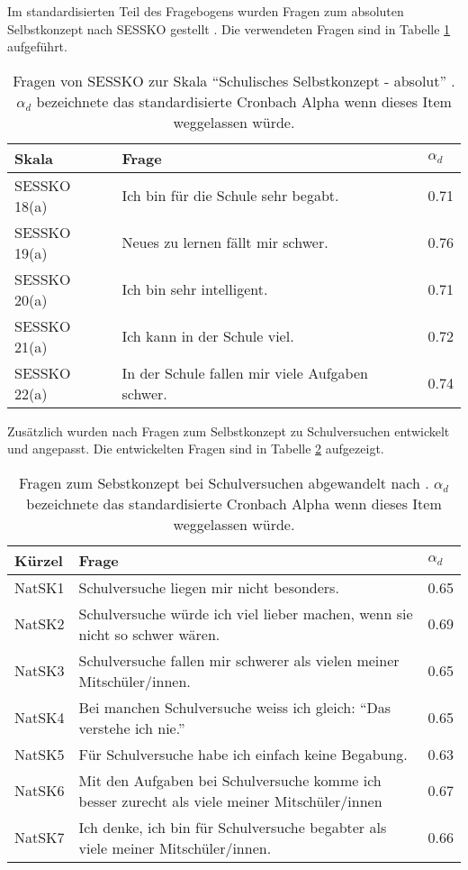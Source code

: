 Im standardisierten Teil des Fragebogens wurden Fragen zum absoluten Selbstkonzept nach SESSKO gestellt \citep{Schone2002}. Die verwendeten Fragen sind in Tabelle \ref{tab:SESSKO} aufgeführt. 



\begin{table}[htbp]
  \centering
\begin{tabular}{|p{3cm}|p{9cm}|p{1cm}|}
\hline Skala & Frage & $\alpha_d$  \\ 
\hline SESSKO 18(a) & Ich bin für die Schule sehr begabt. &  0.71  \\ 
\hline SESSKO 19(a) & Neues zu lernen fällt mir schwer.  &  0.76 \\ 
\hline SESSKO 20(a) & Ich bin sehr intelligent. &  0.71  \\ 
\hline SESSKO 21(a) & Ich kann in der Schule viel. &  0.72   \\ 
\hline SESSKO 22(a) & In der Schule fallen mir viele Aufgaben schwer.  & 0.74   \\ 
\hline 
\end{tabular} 

  \caption{Fragen von SESSKO zur Skala "`Schulisches Selbstkonzept - absolut"'  \citep{Schone2002}. $\alpha_d$ bezeichnete das standardisierte Cronbach Alpha wenn dieses Item weggelassen würde.}
  \label{tab:SESSKO}
\end{table}

Zusätzlich wurden nach \citet{Dierks2014} Fragen zum Selbstkonzept zu Schulversuchen entwickelt und angepasst. Die entwickelten Fragen sind in Tabelle \ref{tab:NatSK} aufgezeigt.

\begin{table}[htbp]
  \centering
\begin{tabular}{|p{2cm}|p{10cm}|p{1cm}|}
\hline Kürzel & Frage & $\alpha_d$  \\ 
\hline NatSK1 & Schulversuche liegen mir nicht besonders. &  0.65  \\ 
\hline NatSK2 & Schulversuche würde ich viel lieber machen, wenn sie nicht so schwer wären.  &  0.69 \\ 
\hline NatSK3 & Schulversuche fallen mir schwerer als vielen meiner Mitschüler/innen. &  0.65  \\ 
\hline NatSK4 & Bei manchen Schulversuche weiss ich gleich: "`Das verstehe ich nie."' &  0.65   \\ 
\hline NatSK5 & Für Schulversuche habe ich einfach keine Begabung.   & 0.63   \\ 
\hline NatSK6 & Mit den Aufgaben bei Schulversuche komme ich besser zurecht als viele meiner Mitschüler/innen  & 0.67   \\ 
\hline NatSK7 & Ich denke, ich bin für Schulversuche begabter als viele meiner Mitschüler/innen.  & 0.66   \\ 
\hline 
\end{tabular} 

  \caption{Fragen zum Sebstkonzept bei Schulversuchen abgewandelt nach \citet{Dierks2014}. $\alpha_d$ bezeichnete das standardisierte Cronbach Alpha wenn dieses Item weggelassen würde.}
  \label{tab:NatSK}
\end{table}

